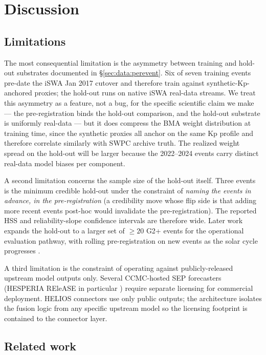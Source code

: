 \documentclass[11pt,letterpaper]{article}
\begin{document}
\section{Discussion}
\label{sec:discussion}

\subsection{Limitations}

The most consequential limitation is the asymmetry between training and
hold-out substrates documented in §\ref{sec:data:perevent}.  Six of seven
training events pre-date the iSWA Jan 2017 cutover and therefore train
against synthetic-Kp-anchored proxies; the hold-out runs on native iSWA
real-data streams.  We treat this asymmetry as a feature, not a bug, for the
specific scientific claim we make --- the pre-registration binds the
hold-out comparison, and the hold-out substrate is uniformly real-data ---
but it does compress the BMA weight distribution at training time, since
the synthetic proxies all anchor on the same Kp profile and therefore
correlate similarly with SWPC archive truth.  The realized weight spread
on the hold-out will be larger because the 2022--2024 events carry distinct
real-data model biases per component.

A second limitation concerns the sample size of the hold-out itself.
Three events is the minimum credible hold-out under the constraint of
\emph{naming the events in advance, in the pre-registration} (a credibility
move whose flip side is that adding more recent events post-hoc would
invalidate the pre-registration).  The reported HSS and reliability-slope
confidence intervals are therefore wide.  Later work expands the hold-out
to a larger set of $\ge 20$ G2+ events for the operational evaluation
pathway, with rolling pre-registration on new events as the solar cycle
progresses \cite{helios_program}.

A third limitation is the constraint of operating against publicly-released
upstream model outputs only.  Several CCMC-hosted SEP forecasters
(HESPERIA REleASE in particular \cite{hesperia}) require separate
licensing for commercial deployment.  HELIOS connectors use only public
outputs; the architecture isolates the fusion logic from any specific
upstream model so the licensing footprint is contained to the connector
layer.

\subsection{Related work}
\label{sec:discussion:related}
\end{document}
